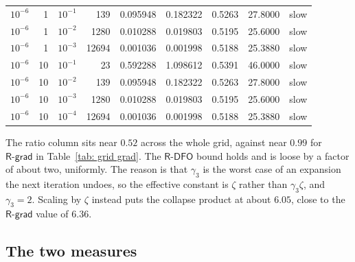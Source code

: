 \documentclass[11pt,a4paper]{article}
\providecommand{\Rdfo}{\textsf{R-DFO}}
\providecommand{\Rgrad}{\textsf{R-grad}}
\providecommand{\gthree}{\gamma_3}
\theoremstyle{definition}
\theoremstyle{remark}
\begin{document}
\begin{table}[H]
\begin{tabular}{rrrrrrrrl}
    $10^{-6}$ & 1    & $10^{-1}$ & 139   & 0.095948 & 0.182322 & 0.5263 & 27.8000 & slow \\
    $10^{-6}$ & 1    & $10^{-2}$ & 1280  & 0.010288 & 0.019803 & 0.5195 & 25.6000 & slow \\
    $10^{-6}$ & 1    & $10^{-3}$ & 12694 & 0.001036 & 0.001998 & 0.5188 & 25.3880 & slow \\
    $10^{-6}$ & 10   & $10^{-1}$ & 23    & 0.592288 & 1.098612 & 0.5391 & 46.0000 & slow \\
    $10^{-6}$ & 10   & $10^{-2}$ & 139   & 0.095948 & 0.182322 & 0.5263 & 27.8000 & slow \\
    $10^{-6}$ & 10   & $10^{-3}$ & 1280  & 0.010288 & 0.019803 & 0.5195 & 25.6000 & slow \\
    $10^{-6}$ & 10   & $10^{-4}$ & 12694 & 0.001036 & 0.001998 & 0.5188 & 25.3880 & slow \\
    \bottomrule
  \end{tabular}
\end{table}

The ratio column sits near $0.52$ across the whole grid, against near $0.99$ for
$\Rgrad$ in Table~\ref{tab: grid grad}. The $\Rdfo$ bound holds and is loose by a
factor of about two, uniformly. The reason is that $\gthree$ is the worst case of
an expansion the next iteration undoes, so the effective constant is $\zeta$
rather than $\gthree\zeta$, and $\gthree = 2$. Scaling by $\zeta$ instead puts
the collapse product at about $6.05$, close to the $\Rgrad$ value of $6.36$.

\subsection{The two measures}
\end{document}
